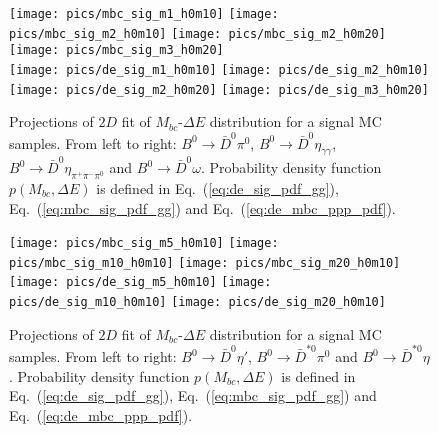 \documentclass[preprint,aps,showpacs]{revtex4}
\newcommand{\bdpi}{\ensuremath{B^0\to \bar D^0\pi^0}\xspace}
\newcommand{\bdetagg}{\ensuremath{B^0\to \bar D^0\eta_{\gamma\gamma}}\xspace}
\newcommand{\bdetap}{\ensuremath{B^0\to \bar D^0\eta\prime}\xspace}
\newcommand{\bdetappp}{\ensuremath{B^0\to \bar D^0\eta_{\pi^+\pi^-\pi^0}}\xspace}
\newcommand{\bdomega}{\ensuremath{B^0\to \bar D^0\omega}\xspace}
\newcommand{\btodstpi}{\ensuremath{B^0\to \bar D^{*0}\pi^0}\xspace}
\newcommand{\btodsteta}{\ensuremath{B^0\to \bar D^{*0}\eta}\xspace}
\newcommand{\de}{\ensuremath{\Delta E}\xspace}
\newcommand{\mbc}{\ensuremath{M_{bc}}\xspace}
\begin{document}
\begin{figure}[htb]
 \texttt{[image: pics/mbc\_sig\_m1\_h0m10]}
 \texttt{[image: pics/mbc\_sig\_m2\_h0m10]}
 \texttt{[image: pics/mbc\_sig\_m2\_h0m20]}
 \texttt{[image: pics/mbc\_sig\_m3\_h0m20]}\\
 \texttt{[image: pics/de\_sig\_m1\_h0m10]}
 \texttt{[image: pics/de\_sig\_m2\_h0m10]}
 \texttt{[image: pics/de\_sig\_m2\_h0m20]}
 \texttt{[image: pics/de\_sig\_m3\_h0m20]}
 \caption{Projections of $2D$ fit of \mbc-\de distribution for a signal MC samples. From left to right: \bdpi, \bdetagg, \bdetappp and \bdomega. Probability density function $p(\mbc,\de)$ is defined in Eq.~(\ref{eq:de_sig_pdf_gg}), Eq.~(\ref{eq:mbc_sig_pdf_gg}) and Eq.~(\ref{eq:de_mbc_ppp_pdf}).}
\label{fig:de-mbc-sig}
\end{figure}

\begin{figure}[htb]
 \texttt{[image: pics/mbc\_sig\_m5\_h0m10]}
 \texttt{[image: pics/mbc\_sig\_m10\_h0m10]}
 \texttt{[image: pics/mbc\_sig\_m20\_h0m10]}\\
 \texttt{[image: pics/de\_sig\_m5\_h0m10]}
 \texttt{[image: pics/de\_sig\_m10\_h0m10]}
 \texttt{[image: pics/de\_sig\_m20\_h0m10]}
 \caption{Projections of $2D$ fit of \mbc-\de distribution for a signal MC samples. From left to right: \bdetap, \btodstpi and \btodsteta. Probability density function $p(\mbc,\de)$ is defined in Eq.~(\ref{eq:de_sig_pdf_gg}), Eq.~(\ref{eq:mbc_sig_pdf_gg}) and Eq.~(\ref{eq:de_mbc_ppp_pdf}).}
\label{fig:de-mbc-sig-prime-star}
\end{figure}

\end{document}
